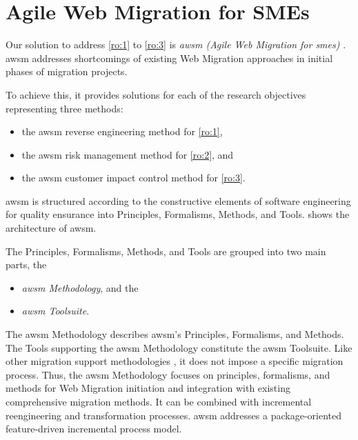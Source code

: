 \hypertarget{sec:solution-overview}{%
\section{Agile Web Migration for SMEs}\label{sec:solution-overview}}

Our solution to address \cref{ro:1} to \cref{ro:3} is \emph{\gls{awsm} (Agile Web Migration for \glspl{sme})} \autocite{Heil2016AWSM}.
\gls{awsm} addresses shortcomings of existing \gls{Web Migration} approaches in initial phases of migration projects.

To achieve this, it provides solutions for each of the research objectives representing three methods:

\begin{itemize}
\item the \gls{awsm} reverse engineering method for \cref{ro:1},
\item the \gls{awsm} risk management method for \cref{ro:2}, and
\item the \gls{awsm} customer impact control method for \cref{ro:3}.
\end{itemize}


\gls{awsm} is structured according to the constructive elements of software engineering for quality ensurance \autocite{Wallmueller2001SoftwareQuality} into Principles, Formalisms, Methods, and Tools.
 shows the architecture of \gls{awsm}.

The Principles, Formalisms, Methods, and Tools are grouped into two main parts, the
\begin{itemize}
\item \emph{\gls{awsm} Methodology}, and the
\item \emph{\gls{awsm} Toolsuite}.
\end{itemize}


The \gls{awsm} Methodology describes \gls{awsm}'s Principles, Formalisms, and Methods.
The Tools supporting the \gls{awsm} Methodology constitute the \gls{awsm} Toolsuite.
Like other migration support methodologies  \autocite{Lewis2008SMART,Lewis2005SMART}, it does not impose a specific migration process.
Thus, the \gls{awsm} Methodology focuses on principles, formalisms, and methods for \gls{Web Migration} initiation and integration with existing comprehensive migration methods.
It can be combined with incremental reengineering and transformation processes.
\gls{awsm} addresses a package-oriented \autocite{Brodie1995Migrating} feature-driven \autocite{Menychtas2014ARTISTJournal} incremental process model.

